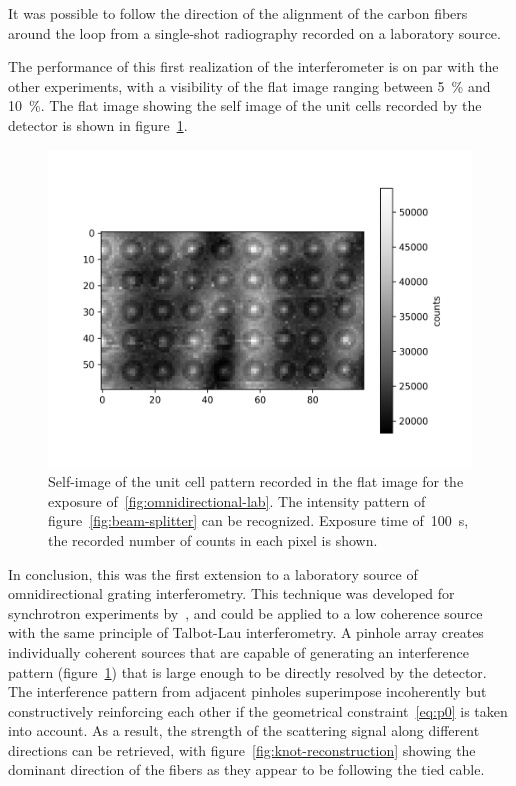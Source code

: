 It was possible to follow the direction of the alignment of the
carbon fibers around the loop from a single-shot radiography recorded on a
laboratory source.

The performance of this first realization of the interferometer is on par
with the other experiments, with a visibility of the flat image ranging
between \SI{5}{\percent} and \SI{10}{\percent}. The flat image showing the
self image of the unit cells recorded by the detector is shown in
figure~\ref{fig:cells}.

\begin{figure}[htb]
    \centering
    \includegraphics[width=\textwidth]{gfx/omnidirectional/visibility-omnidirectional.png}
    \caption{Self-image of the unit cell pattern recorded in the flat image
        for the exposure of~\ref{fig:omnidirectional-lab}. The intensity
        pattern of figure~\ref{fig:beam-splitter} can be recognized.
        Exposure time of~\SI{100}{\second}, the recorded number of counts in
    each pixel is shown.}
    \label{fig:cells}
\end{figure}

In conclusion, this was the first extension to a laboratory source of
omnidirectional grating interferometry. This technique was developed for
synchrotron experiments by~\cite{PhysRevLett.116.093902}, and could be
applied to a low coherence source with the same principle of Talbot-Lau
interferometry. A pinhole array creates individually coherent sources that
are capable of generating an interference pattern (figure~\ref{fig:cells})
that is large enough to be directly resolved by the detector. The
interference pattern from adjacent pinholes superimpose incoherently but
constructively reinforcing each other if the geometrical
constraint~\eqref{eq:p0} is taken into account. As a result, the strength of
the scattering signal along different directions can be retrieved, with
figure~\ref{fig:knot-reconstruction} showing the dominant direction of the
fibers as they appear to be following the tied cable.
